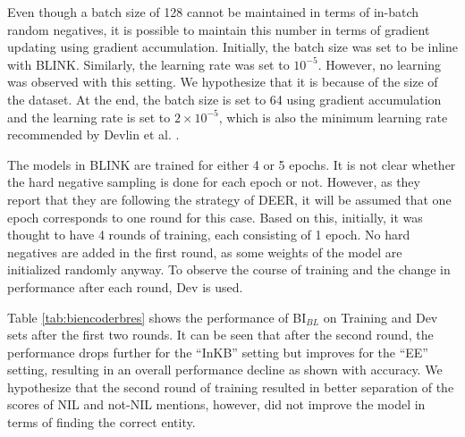 \documentclass{report}
\theoremstyle{definition}
\theoremstyle{remark}
\begin{document}
Even though a batch size of 128 cannot be maintained in terms of in-batch random negatives, it is possible to maintain this number in terms of gradient updating using gradient accumulation. Initially, the batch size was set to be inline with BLINK. Similarly, the learning rate was set to $10^{-5}$. However, no learning was observed with this setting. We hypothesize that it is because of the size of the dataset. At the end, the batch size is set to 64 using gradient accumulation and the learning rate is set to $2 \times 10^{-5}$, which is also the minimum learning rate recommended by Devlin et al. \cite{BERT}.

The models in BLINK are trained for either 4 or 5 epochs. It is not clear whether the hard negative sampling is done for each epoch or not. However, as they report that they are following the strategy of DEER, it will be assumed that one epoch corresponds to one round for this case. Based on this, initially, it was thought to have 4 rounds of training, each consisting of 1 epoch. No hard negatives are added in the first round, as some weights of the model are initialized randomly anyway. To observe the course of training and the change in performance after each round, Dev is used.

Table \ref{tab:biencoderbres} shows the performance of BI$_{BL}$ on Training and Dev sets after the first two rounds. It can be seen that after the second round, the performance drops further for the ``InKB'' setting but improves for the ``EE'' setting, resulting in an overall performance decline as shown with accuracy. We hypothesize that the second round of training resulted in better separation of the scores of NIL and not-NIL mentions, however, did not improve the model in terms of finding the correct entity. 
\end{document}
